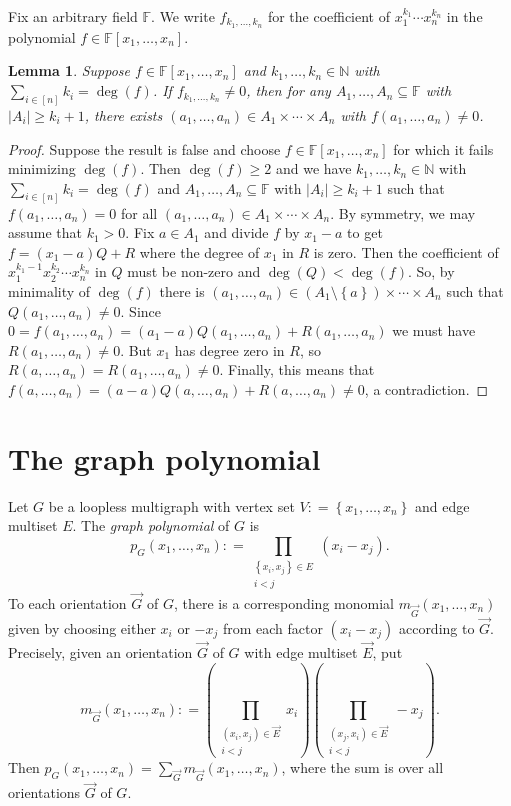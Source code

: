 \documentclass[openany]{tufte-book} %
\theoremstyle{plain}
\newtheorem{lemma}{Lemma}
\newcommand{\set}[1]{\left\{ #1 \right\}}
\newcommand{\card}[1]{\left|#1\right|}
\newcommand{\irange}[1]{\left[#1\right]}
\newcommand{\parens}[1]{\left( #1 \right)}
\newcommand{\DefinedAs}{\mathrel{\mathop:}=}
\newcommand{\IN}{\mathbb{N}}
\begin{document}
Fix an arbitrary field $\mathbb{F}$. We write $f_{k_1, \ldots, k_n}$ for the coefficient of $x_1^{k_1}\cdots x_n^{k_n}$ in the polynomial $f \in \mathbb{F}[x_1, \ldots, x_n]$. 
\begin{lemma}
Suppose $f \in \mathbb{F}[x_1, \ldots, x_n]$ and $k_1, \ldots, k_n \in \IN$ with $\sum_{i \in \irange{n}} k_i = \deg(f)$.  If $f_{k_1, \ldots, k_n} \ne 0$, then for any $A_1, \ldots, A_n \subseteq \mathbb{F}$ with $\card{A_i} \ge k_i + 1$, there exists $(a_1, \ldots, a_n) \in A_1 \times \cdots \times A_n$ with $f(a_1, \ldots, a_n) \ne 0$.
\end{lemma}
\begin{proof}
Suppose the result is false and choose $f \in \mathbb{F}[x_1, \ldots, x_n]$ for which it fails 
minimizing $\deg(f)$. Then $\deg(f) \ge 2$ and we have $k_1, \ldots, k_n \in \IN$ with $\sum_{i \in \irange{n}} k_i = \deg(f)$ and 
$A_1, \ldots, A_n \subseteq \mathbb{F}$ with $\card{A_i} \ge k_i + 1$ such that $f(a_1, \ldots, a_n) = 0$ for all $(a_1, \ldots, a_n) \in A_1 \times \cdots \times A_n$.  
By symmetry, we may assume that $k_1 > 0$.  Fix $a \in A_1$ and divide $f$ by $x_1 - a$ to get $f = (x_1 - a)Q + R$ where the degree of $x_1$ in $R$ is zero.  
Then the coefficient of $x_1^{k_1-1}x_2^{k_2} \cdots x_n^{k_n}$ in $Q$ must be non-zero and $\deg(Q) < \deg(f)$.  So, by minimality of $\deg(f)$ there 
is $(a_1, \ldots, a_n) \in (A_1 \setminus \set{a}) \times \cdots \times A_n$ such that $Q(a_1,\ldots, a_n) \ne 0$.  
Since $0 = f(a_1,\ldots, a_n) = (a_1 - a)Q(a_1,\ldots, a_n) + R(a_1,\ldots, a_n)$ we must have $R(a_1,\ldots, a_n) \ne 0$.  
But $x_1$ has degree zero in $R$, so $R(a,\ldots, a_n) = R(a_1,\ldots, a_n) \ne 0$.  
Finally, this means that $f(a,\ldots, a_n) = (a-a)Q(a,\ldots, a_n) + R(a,\ldots, a_n) \ne 0$, a contradiction.
\end{proof}

\section{The graph polynomial}
Let $G$ be a loopless multigraph with vertex set $V \DefinedAs \set{x_1, \ldots, x_n}$ and edge multiset $E$.  The \emph{graph polynomial} of $G$ is
\[p_G(x_1,\ldots,x_n) \DefinedAs \prod_{\substack{\set{x_i,x_j} \in E\\i < j}} (x_i - x_j).\]
To each orientation $\vec{G}$ of $G$, there is a corresponding monomial $m_{\vec{G}}(x_1,\ldots, x_n)$ given by choosing either $x_i$ or $-x_j$ from each factor $(x_i - x_j)$ according to $\vec{G}$. Precisely, given an orientation $\vec{G}$ of $G$ with edge multiset $\vec{E}$, put
\[m_{\vec{G}}(x_1,\ldots, x_n) \DefinedAs \parens{\prod_{\substack{(x_i,x_j) \in \vec{E}\\i < j}} x_i}\parens{\prod_{\substack{(x_j,x_i) \in \vec{E}\\i < j}} -x_j}.\]
Then $p_G(x_1,\ldots,x_n) = \sum_{\vec{G}} m_{\vec{G}}(x_1,\ldots, x_n)$, where the sum is over all orientations $\vec{G}$ of $G$.  
\end{document}
